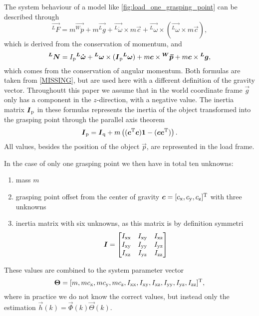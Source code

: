 The system behaviour of a model like \ref{fig:load_one_grasping_point} can be described through 
\begin{equation}
	\vec{^LF} = m \vec{^W\ddot{p}} + m \vec{^Lg} + \vec{^L\dot{\omega}} \times m \vec c + \vec{^L\omega} \times (\vec{^L\omega} \times m \vec c),
	\label{eq:force}
\end{equation}
which is derived from the conservation of momentum, and
\begin{equation}
	\boldsymbol{^LN} = I_{\mathrm{p}} \boldsymbol{^L\dot{\omega}} + \boldsymbol{^L\omega} \times (\boldsymbol{I}_{\mathrm{p}} \boldsymbol{^L\omega}) + m \boldsymbol{c} \times \boldsymbol{^W\ddot{p}} + m \boldsymbol{c} \times \boldsymbol{^Lg},
	\label{eq:torque}
\end{equation}
which comes from the conservation of angular momentum. Both formulas are taken from \ref{MISSING}, but are used here with a different definition of the gravity vector. Throughoutt this paper we assume that in the world coordinate frame $\vec g$ only has a component in the $z$-direction, with a negative value. The inertia matrix $\boldsymbol{I}_{\mathrm{p}}$ in these formulas represents the inertia of the object transformed into the grasping point through the parallel axis theorem
\begin{equation}
	\boldsymbol{I}_{\mathrm{p}} = \boldsymbol{I}_{\mathrm{q}} + m \left( (\boldsymbol{c}^{\mathrm{T}} \boldsymbol{c}) \boldsymbol{1} - (\boldsymbol{c} \boldsymbol{c}^{\mathrm{T}}) \right).
\end{equation}
All values, besides the position of the object $\vec p$, are represented in the load frame.

In the case of only one grasping point we then have in total ten unknowns:
\begin{enumerate}
	\item mass $m$
	\item grasping point offset from the center of gravity $\boldsymbol{c} = [c_{\mathrm{x}}, c_{\mathrm{y}}, c_{\mathrm{z}}]^{\mathrm{T}}$ with three unknowns
	\item inertia matrix with six unknowns, as this matrix is by definition symmetri
	\begin{equation}
		\boldsymbol{I} = 
		\begin{bmatrix}	
			I_{\mathrm{xx}}	& I_{\mathrm{xy}}	& I_{\mathrm{xz}} \\
			I_{\mathrm{xy}}	& I_{\mathrm{yy}}	& I_{\mathrm{yz}} \\
			I_{\mathrm{xz}}	& I_{\mathrm{yz}}	& I_{\mathrm{zz}}
		\end{bmatrix}
	\end{equation}
\end{enumerate}

These values are combined to the system parameter vector
\begin{equation}
	\boldsymbol{\Theta} = [m, m c_{\mathrm{x}}, m c_{\mathrm{y}}, m c_{\mathrm{z}}, I_{\mathrm{xx}}, I_{\mathrm{xy}}, I_{\mathrm{xz}}, I_{\mathrm{yy}},I_{\mathrm{yz}}, I_{\mathrm{zz}}]^{\mathrm{T}},
\end{equation}
where in practice we do not know the correct values, but instead only the estimation $\vec{h}(k) = \vec{\Phi}(k) \vec{\Theta}(k)$.

